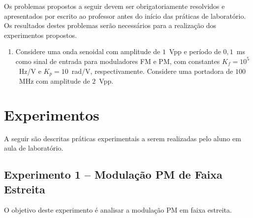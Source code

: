 \documentclass[12pt,addpoints]{exam}
\begin{document}
Os problemas propostos a seguir devem ser obrigatoriamente resolvidos e apresentados por escrito ao professor antes do início das práticas de laboratório. Os resultados destes problemas serão necessários para a realização dos experimentos propostos. 

\begin{enumerate}
    \item Considere uma onda senoidal com amplitude de $1$~Vpp e período de $0,1$~ms como sinal de entrada para moduladores FM e PM, com constantes $K_f = 10^5$~Hz/V e $K_{p} = 10$~rad/V, respectivamente. Considere uma portadora de $100$~MHz com amplitude de $2$~Vpp.
\end{enumerate}

\section{Experimentos}

A seguir são descritas práticas experimentais a serem realizadas pelo aluno em aula de laboratório. 

\subsection{Experimento 1 -- Modulação PM de Faixa Estreita}

O objetivo deste experimento é analisar a modulação PM em faixa estreita.
\end{document}
